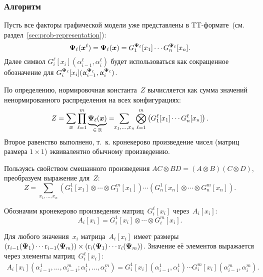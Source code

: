 \subsubsection{Алгоритм}
Пусть все факторы графической модели уже представлены в TT\hyp{}формате~(см. раздел~\ref{sec:prob-representation}):
\begin{equation}
\boldsymbol{\Psi}_{\ell}(\boldsymbol{x}^{\ell}) = \boldsymbol{\Psi}_{\ell}(\boldsymbol{x}) = G^{\boldsymbol{\Psi}_{\ell}}_1[x_1] \dotsm G^{\boldsymbol{\Psi}_{\ell}}_n[x_n].
\end{equation}
Далее символ $G^{\ell}_i[x_i](\alpha^{\ell}_{i - 1}, \alpha^{\ell}_i)$ будет использоваться как сокращенное обозначение для $G^{\boldsymbol{\Psi}_{\ell}}_i[x_i](\upalpha^{\boldsymbol{\Psi}_{\ell}}_{i - 1}, \upalpha^{\boldsymbol{\Psi}_{\ell}}_i)$.

По определению, нормировочная константа~$Z$ вычисляется как сумма значений ненормированного распределения на всех конфигурациях:
\begin{equation*}
Z = \sum_{\boldsymbol{x}} \prod_{\ell = 1}^{m} \underbrace{\boldsymbol{\Psi}_{\ell}(\boldsymbol{x})}_{\text{$\in \mathbb{R}$}}
= \!\!\sum_{x_1, \dots, x_n} \bigotimes_{\ell = 1}^{m} \left (G^{\ell}_1[x_1] \dotsm G^{\ell}_n[x_n]  \right).
\end{equation*}
Второе равенство выполнено, т.~к. кронекерово произведение чисел (матриц размера $1 \times 1$) эквивалентно обычному произведению.


Пользуясь свойством смешанного произведения $AC \otimes BD = (A\otimes B)(C \otimes D)$, преобразуем выражение для~$Z$:
\begin{equation*}
Z =
\sum_{x_1, \dots, x_n} \left ( G^1_1[x_1] \otimes \dotsb \otimes G^m_1[x_1] \right ) \dotsm
\left ( G^1_n[x_n] \otimes \dotsb \otimes G^m_n[x_n] \right ).
\end{equation*}

Обозначим кронекерово произведение матриц~$G^\ell_i[x_i]$ через~$A_i[x_i]$:
\begin{equation*}
A_i[x_i] = G^1_i[x_i] \otimes \dotsb \otimes G^m_i[x_i].
\end{equation*}

Для любого значения~$x_i$ матрица~$A_i[x_i]$ имеет размеры $(\operatorname{r}_{i - 1}(\boldsymbol{\Psi}_1)  \dotsm  \operatorname{r}_{i - 1}(\boldsymbol{\Psi}_m)) \times (\operatorname{r}_{i}(\boldsymbol{\Psi}_1)  \dotsm  \operatorname{r}_{i}(\boldsymbol{\Psi}_m))$. Значение её элементов выражается через элементы матриц~$G_i^{\ell}[x_i]$:
\begin{multline*}
A_i[x_i](\alpha^1_{i - 1}, \dots, \alpha^m_{i - 1}; \alpha^1_i, \dots, \alpha^m_i) = G^1_i[x_i](\alpha^1_{i - 1}, \alpha^1_i)  \dotsm  G^m_i[x_i](\alpha^m_{i - 1}, \alpha^m_i).
\end{multline*}

